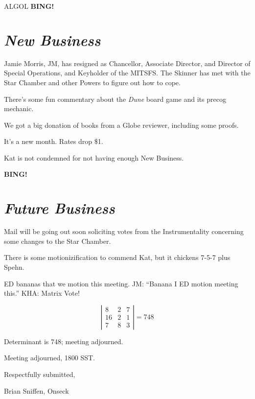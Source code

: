 \documentclass[10pt]{article}
\newcommand{\bing}{{\bf BING!} }
\newcommand{\goto}[1]{\bing \vskip 12pt \section*{{\em{#1}}}}
\newcommand{\ps}{ plus Spehn\xspace}
\begin{document}
ALGOL
\goto{New Business}

Jamie Morris, JM, has resigned as Chancellor, Associate Director, and
Director of Special Operations, and Keyholder of the MITSFS.  The
Skinner has met with the Star Chamber and other Powers to figure out
how to cope.

There's some fun commentary about the \emph{Dune} board game and its
precog mechanic.

We got a big donation of books from a Globe reviewer, including some
proofs.

It's a new month.  Rates drop \$1.

Kat is not condemned for not having enough New Business.

\goto{Future Business}

Mail will be going out soon soliciting votes from the Instrumentality
concerning some changes to the Star Chamber.

There is some motionizification to commend Kat, but it chickens
7-5-7\ps.

ED bananas that we motion this meeting.
JM: ``Banana I ED motion meeting this.''
KHA: Matrix Vote!

\[
\left|\begin{array}{ccc}
8 & 2 & 7\\
16 & 2 & 1\\
7  & 8 & 3
\end{array}\right| = 748
\]

Determinant is 748; meeting adjourned.


\vspace{12pt}

\noindent
Meeting adjourned, 1800 SST.

\vspace{18pt}

\centerline{Respectfully submitted,}
\centerline{Brian Sniffen, Onseck}
\end{document}
